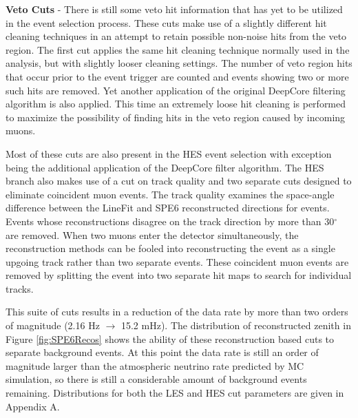 \documentclass{gatech-thesis}
\begin{document}
\begin{adjustwidth}{2.5em}{2.5em}
\textbf{Veto Cuts} - There is still some veto hit information that has yet to be utilized in the event selection process. These cuts make use of a slightly different hit cleaning techniques in an attempt to retain possible non-noise hits from the veto region. The first cut applies the same hit cleaning technique normally used in the analysis, but with slightly looser cleaning settings. The number of veto region hits that occur prior to the event trigger are counted and events showing two or more such hits are removed. Yet another application of the original DeepCore filtering algorithm is also applied. This time an extremely loose hit cleaning is performed to maximize the possibility of finding hits in the veto region caused by incoming muons.
\end{adjustwidth}
\setlength{\parindent}{17.5pt}

Most of these cuts are also present in the HES event selection with exception being the additional application of the DeepCore filter algorithm. The HES branch also makes use of a cut on track quality and two separate cuts designed to eliminate coincident muon events. The track quality examines the space-angle difference between the LineFit and SPE6 reconstructed directions for events. Events whose reconstructions disagree on the track direction by more than 30$^{\circ}$ are removed. When two muons enter the detector simultaneously, the reconstruction methods can be fooled into reconstructing the event as a single upgoing track rather than two separate events. These coincident muon events are removed by splitting the event into two separate hit maps to search for individual tracks. 

This suite of cuts results in a reduction of the data rate by more than two orders of magnitude (2.16 Hz $\rightarrow$ 15.2 mHz). The distribution of reconstructed zenith in Figure \ref{fig:SPE6Recos} shows the ability of these reconstruction based cuts to separate background events. At this point the data rate is still an order of magnitude larger than the atmospheric neutrino rate predicted by MC simulation, so there is still a considerable amount of background events remaining. Distributions for both the LES and HES cut parameters are given in Appendix A.
\end{document}
